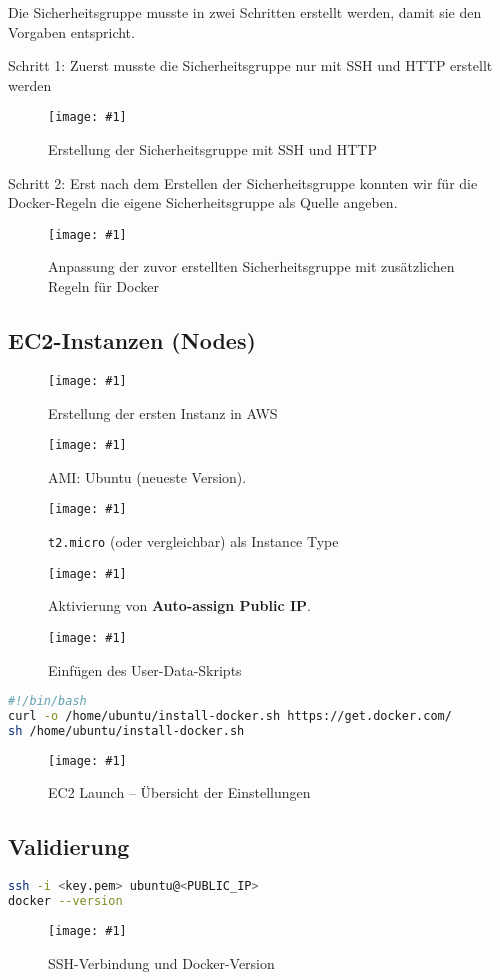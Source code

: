 \documentclass[BMR,Seminar,ngerman,IEEE]{twbook}
\newcommand{\screenshotH}[3]{%
  \begin{figure}[H]
    \centering
    \texttt{[image: \#1]}%
    \caption{#2}%
    \label{fig:#3}%
  \end{figure}%
}
\begin{document}
Die Sicherheitsgruppe musste in zwei Schritten erstellt werden, damit sie den Vorgaben entspricht.

Schritt 1: Zuerst musste die Sicherheitsgruppe nur mit SSH und HTTP erstellt werden
\screenshotH{create_inbound_rules.png}{Erstellung der Sicherheitsgruppe mit SSH und HTTP}{create-inbound-rules}
\FloatBarrier
Schritt 2: Erst nach dem Erstellen der Sicherheitsgruppe konnten wir für die Docker-Regeln die eigene Sicherheitsgruppe als Quelle angeben.
\screenshotH{edit_inbound_rules.png}{Anpassung der zuvor erstellten Sicherheitsgruppe mit zusätzlichen Regeln für Docker}{edit-inbound-rules}
\FloatBarrier

\subsection{EC2-Instanzen (Nodes)}

\screenshotH{create_instance.png}{Erstellung der ersten Instanz in AWS}{create-instance}
\FloatBarrier
\screenshotH{operating_system.png}{AMI: Ubuntu (neueste Version).}{operating-system}
\FloatBarrier
\screenshotH{instance_type.png}{\texttt{t2.micro} (oder vergleichbar) als Instance Type}{instance-type}
\FloatBarrier
\screenshotH{networksettings.png}{Aktivierung von \textbf{Auto-assign Public IP}.}{networksettings}
\FloatBarrier
\screenshotH{userdata.png}{Einfügen des User-Data-Skripts}{userdata}
\FloatBarrier

\begin{lstlisting}[language=bash,caption={EC2 User Data – Docker Installation}]
#!/bin/bash
curl -o /home/ubuntu/install-docker.sh https://get.docker.com/
sh /home/ubuntu/install-docker.sh
\end{lstlisting}

\screenshotH{instance_summary.png}{EC2 Launch – Übersicht der Einstellungen}{ec2-launch}
\FloatBarrier

\subsection{Validierung}
\begin{lstlisting}[language=bash]
ssh -i <key.pem> ubuntu@<PUBLIC_IP>
docker --version
\end{lstlisting}
\screenshotH{ssh_connection.png}{SSH-Verbindung und Docker-Version}{ssh-docker}
\FloatBarrier

\end{document}
